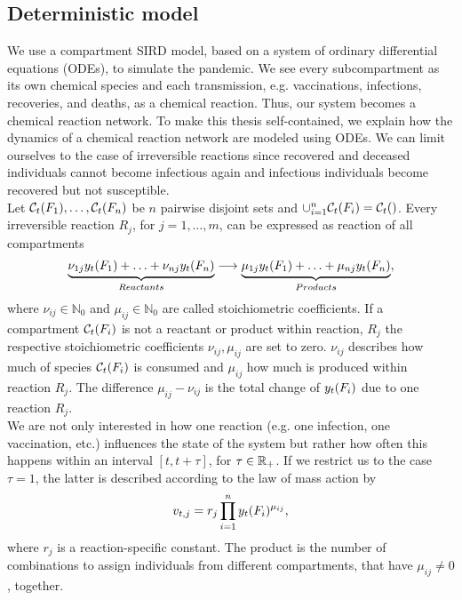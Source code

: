 \subsection{Deterministic model}
We use a compartment SIRD model, based on a system of ordinary differential equations (ODEs), to simulate the pandemic. We see every subcompartment as its own chemical species and each transmission, e.g. vaccinations, infections, recoveries, and deaths, as a chemical reaction. Thus, our system becomes a chemical reaction network. To make this thesis self-contained, we explain how the dynamics of a chemical reaction network are modeled using ODEs. We can limit ourselves to the case of irreversible reactions since recovered and deceased individuals cannot become infectious again and infectious individuals become recovered but not susceptible. \\

Let $\mathcal{C}_t(F_1), \dots, \mathcal{C}_t(F_n)$ be $n$ pairwise disjoint sets and $\cup_{i=1}^n \mathcal{C}_t(F_i) = \mathcal{C}_t()$. Every irreversible reaction $R_j$, for $j = 1, \dots, m$, can be expressed as reaction of all compartments
\begin{align}
\underbrace{\nu_{1j} y_t(F_1) + \hdots + \nu_{nj} y_t(F_n)}_{Reactants} \longrightarrow \underbrace{\mu_{1j} y_t(F_1) + \hdots + \mu_{nj} y_t(F_n)}_{Products},
\end{align}
where $\nu_{ij} \in \mathbb{N}_0$ and $\mu_{ij} \in \mathbb{N}_0$ are called stoichiometric coefficients.  If a compartment $\mathcal{C}_t(F_i)$ is not a reactant or product within reaction, $R_j$ the respective stoichiometric coefficients $\nu_{ij}, \mu_{ij}$ are set to zero. $\nu_{ij}$ describes how much of species $\mathcal{C}_t(F_i)$ is consumed and $\mu_{ij}$ how much is produced within reaction $R_j$. The difference $\mu_{ij} - \nu_{ij}$ is the total change of $y_t(F_i)$ due to one reaction $R_j$.\\

We are not only interested in how one reaction (e.g. one infection, one vaccination, etc.) influences the state of the system but rather how often this happens within an interval $[t, t+\tau]$, for $\tau \in \mathbb{R}_+$. If we restrict us to the case $\tau = 1$, the latter is described according to the law of mass action by
\begin{align}
\label{eq:change_one_unit}
v_{t,j} = r_j  \prod_{i=1}^n y_t(F_i)^{\mu_{ij}},
\end{align}
where $r_j$ is a reaction-specific constant. The product is the number of combinations to assign individuals from different compartments, that have $\mu_{ij} \neq 0$, together.

